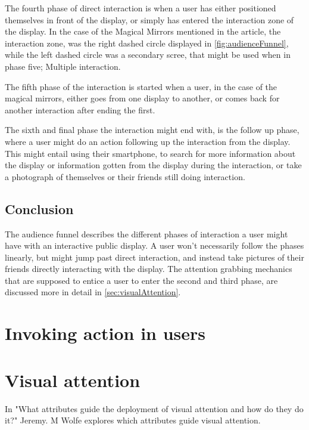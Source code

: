     The fourth phase of direct interaction is when a user has either positioned themselves in front of the display, or simply has entered the interaction zone of the display. In the case of the Magical Mirrors mentioned in the article\cite{interactivePublicDisplays}, the interaction zone, was the right dashed circle displayed in \autoref{fig:audienceFunnel}, while the left dashed circle was a secondary scree, that might be used when in phase five; Multiple interaction.
    
    The fifth phase of the interaction is started when a user, in the case of the magical mirrors, either goes from one display to another, or comes back for another interaction after ending the first\cite{interactivePublicDisplays}.
    
    The sixth and final phase the interaction might end with, is the follow up phase, where a user might do an action following up the interaction from the display. This might entail using their smartphone, to search for more information about the display or information gotten from the display during the interaction, or take a photograph of themselves or their friends still doing interaction\cite{interactivePublicDisplays}. 
    
    \subsection*{Conclusion}
        The audience funnel describes the different phases of interaction a user might have with an interactive public display. A user won't necessarily follow the phases linearly, but might jump past direct interaction, and instead take pictures of their friends directly interacting with the display. The attention grabbing mechanics that are supposed to entice a user to enter the second and third phase, are discussed more in detail in \autoref{sec:visualAttention}.
\section{Invoking action in users} %

\cite{interactivePublicDisplaysKinect}

\section{Visual attention}\label{sec:visualAttention}

In "What attributes guide the deployment of visual attention and how do they do it?" Jeremy. M Wolfe explores which attributes guide visual attention\cite{Wolfe2004}.

